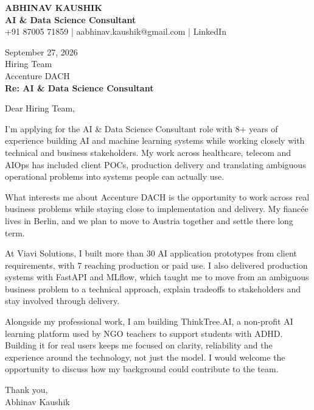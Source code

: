 \documentclass[10pt,a4paper]{article}
\begin{document}
\begin{center}
{\Large\bfseries ABHINAV KAUSHIK}\\[2pt]
{\bfseries AI \& Data Science Consultant}\\[2pt]
+91 87005 71859 \quad | \quad aabhinav.kaushik@gmail.com \quad | \quad LinkedIn
\end{center}
\vspace{8pt}
September 27, 2026\\[6pt]
Hiring Team\\
Accenture DACH\\[4pt]
\textbf{Re: AI \& Data Science Consultant}

Dear Hiring Team,

I’m applying for the AI \& Data Science Consultant role with 8+ years of experience building AI and machine learning systems while working closely with technical and business stakeholders. My work across healthcare, telecom and AIOps has included client POCs, production delivery and translating ambiguous operational problems into systems people can actually use.

What interests me about Accenture DACH is the opportunity to work across real business problems while staying close to implementation and delivery. My fiancée lives in Berlin, and we plan to move to Austria together and settle there long term.

At Viavi Solutions, I built more than 30 AI application prototypes from client requirements, with 7 reaching production or paid use. I also delivered production systems with FastAPI and MLflow, which taught me to move from an ambiguous business problem to a technical approach, explain tradeoffs to stakeholders and stay involved through delivery.

Alongside my professional work, I am building ThinkTree.AI, a non-profit AI learning platform used by NGO teachers to support students with ADHD. Building it for real users keeps me focused on clarity, reliability and the experience around the technology, not just the model. I would welcome the opportunity to discuss how my background could contribute to the team.

Thank you,\\
Abhinav Kaushik
\end{document}
